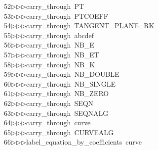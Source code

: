 \begin{tabbing}
52\>$\triangleright$\>$\triangleright$\>$\triangleright$\>carry\_through\ PT\ \\[0pt]
53\>$\triangleright$\>$\triangleright$\>$\triangleright$\>carry\_through\ PTCOEFF\ \\[0pt]
54\>$\triangleright$\>$\triangleright$\>$\triangleright$\>carry\_through\ TANGENT\_PLANE\_RK\ \\[0pt]
55\>$\triangleright$\>$\triangleright$\>$\triangleright$\>carry\_through\ abcdef\ \\[0pt]
56\>$\triangleright$\>$\triangleright$\>$\triangleright$\>carry\_through\ NB\_E\ \\[0pt]
57\>$\triangleright$\>$\triangleright$\>$\triangleright$\>carry\_through\ NB\_ET\ \\[0pt]
58\>$\triangleright$\>$\triangleright$\>$\triangleright$\>carry\_through\ NB\_K\ \\[0pt]
59\>$\triangleright$\>$\triangleright$\>$\triangleright$\>carry\_through\ NB\_DOUBLE\ \\[0pt]
60\>$\triangleright$\>$\triangleright$\>$\triangleright$\>carry\_through\ NB\_SINGLE\ \\[0pt]
61\>$\triangleright$\>$\triangleright$\>$\triangleright$\>carry\_through\ NB\_ZERO\ \\[0pt]
62\>$\triangleright$\>$\triangleright$\>$\triangleright$\>carry\_through\ SEQN\ \\[0pt]
63\>$\triangleright$\>$\triangleright$\>$\triangleright$\>carry\_through\ SEQNALG\ \\[0pt]
64\>$\triangleright$\>$\triangleright$\>$\triangleright$\>carry\_through\ curve\ \\[0pt]
65\>$\triangleright$\>$\triangleright$\>$\triangleright$\>carry\_through\ CURVEALG\ \\[0pt]
66\>$\triangleright$\>$\triangleright$\>$\triangleright$\>label\_equation\_by\_coefficients\ curve\ \\[0pt]

\end{tabbing}
